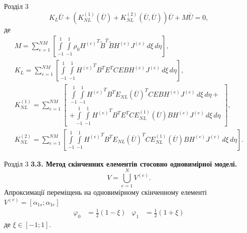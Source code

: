 \documentclass[8pt]{beamer}
\numberwithin{figure}{section}
\numberwithin{equation}{section}
\numberwithin{table}{section}
\begin{document}
\begin{frame}{Розділ 3}
\begin{equation}
K_L\overline{U}+\left( K_{NL}^{(1)}\left( \overline{U}\right)+K_{NL}^{(2)}\left( \overline{U},\overline{U}\right) \right)\overline{U}+M\ddot{\overline{U}}=0,
\end{equation}
де 
\begin{gather}
M=\sum_{e=1}^{NM}
\left[ \int\limits_{-1}^{1} \int\limits_{-1}^{1} \rho_0 {H^{(e)}}^T \tilde{B}^T \tilde{B} H^{(e)} J^{(e)} \, d\xi \, d\eta \right],\\
K_L=\sum_{e=1}^{NM}
\left[ \int\limits_{-1}^{1} \int\limits_{-1}^{1} {H^{(e)}}^T B^T E^T C E B H^{(e)} J^{(e)} \, d\xi \, d\eta \right],\\
K_{NL}^{(1)}=\sum_{e=1}^{NM}
\left[ 
\begin{aligned}
\int\limits_{-1}^{1} \int\limits_{-1}^{1} {H^{(e)}}^T B^T E_{NL}\left( \overline{U}\right)^T C E B H^{(e)} J^{(e)} \, d\xi \, d\eta + \\ 
+ \int\limits_{-1}^{1} \int\limits_{-1}^{1} {H^{(e)}}^T B^T E^T C E_{NL}^{(1)}\left( \overline{U}\right) B H^{(e)} J^{(e)} \, d\xi \, d\eta 
\end{aligned} 
\right],\\
K_{NL}^{(2)}=\sum_{e=1}^{NM}
\left[ 
\int\limits_{-1}^{1} \int\limits_{-1}^{1} {H^{(e)}}^T B^T E_{NL}\left( \overline{U}\right)^T C E_{NL}^{(1)}\left( \overline{U}\right) B H^{(e)} J^{(e)} \, d\xi \, d\eta 
\right].
\end{gather}

\end{frame}

\begin{frame}{Розділ 3}
\textbf{3.3. Метод скінченних елементів стосовно одновимірної моделі.}
\\
\vspace{1em}
\begin{equation}
V=\bigcup\limits_{e=1}^{N} V^{(e)}.
\end{equation}
Апроксимації переміщень на одновимірному скінченному елементі $V^{(e)} = [\alpha_{1s};\alpha_{1e}]$
\begin{equation}
\begin{aligned}
\varphi_0&=\frac{1}{2}\left(1-\xi\right) & \varphi_1 &=\frac{1}{2}\left(1+\xi\right)
\end{aligned}
\end{equation}
де $\xi \in [-1;1]$.
\end{frame}
\end{document}
